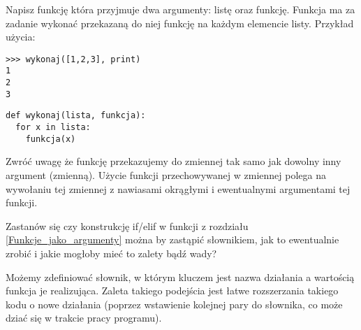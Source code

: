 \dbEntryCheckResults
Napisz funkcję która przyjmuje dwa argumenty: listę oraz funkcję. Funkcja ma za zadanie wykonać przekazaną do niej funkcję na każdym elemencie listy. Przykład użycia:
\begin{Verbatim}
>>> wykonaj([1,2,3], print)
1
2
3
\end{Verbatim}
\fi

\dbEntryCheckResults
\begin{verbatim}
def wykonaj(lista, funkcja):
  for x in lista:
    funkcja(x)
\end{verbatim}

\noindent Zwróć uwagę że funkcję przekazujemy do zmiennej tak samo jak dowolny inny argument (zmienną).
Użycie funkcji przechowywanej w zmiennej polega na wywołaniu tej zmiennej z nawiasami okrągłymi i ewentualnymi argumentami tej funkcji.
\fi

\dbEntryCheckResults
Zastanów się czy konstrukcję if/elif w funkcji  z rozdziału \ref{Funkcje_jako_argumenty} można by zastąpić słownikiem, jak to ewentualnie zrobić i jakie mogłoby mieć to zalety bądź wady?
\fi

\dbEntryCheckResults
Możemy zdefiniować słownik, w którym kluczem jest nazwa działania a wartością funkcja je realizująca.
Zaleta takiego podejścia jest łatwe rozszerzania takiego kodu o nowe działania (poprzez wstawienie kolejnej pary do słownika, co może dziać się w trakcie pracy programu).
\fi
